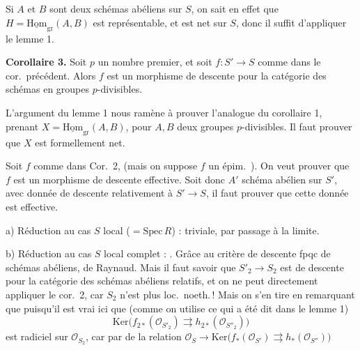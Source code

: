 \documentclass[11pt,a4paper]{article}
\begin{document}
Si $A$ et $B$ sont deux schémas abéliens sur $S$, on sait en effet que
$H = \underline{\mathrm{Hom}}_{\mathrm{gr}}(A, B)$ est représentable, et
est net sur $S$, donc il suffit d'appliquer le lemme 1.

\textbf{Corollaire 3.} Soit $p$ un nombre premier, et soit $f : S' \to S$
comme dans le cor.\ précédent. Alors $f$ est un morphisme de descente pour la
catégorie des  schémas en groupes $p$-divisibles.

L'argument  du lemme 1 nous ramène à prouver l'analogue du
corollaire 1, prenant $X = \underline{\mathrm{Hom}}_{\mathrm{gr}}(A, B)$,
pour $A, B$ deux groupes $p$-divisibles. Il faut prouver que $X$ est
formellement net.

Soit $f$ comme dans Cor.\ 2, (mais on suppose $f$ un épim.\
). On veut prouver que $f$ est un morphisme de descente
effective. Soit donc $A'$ schéma abélien sur $S'$, avec donnée de descente
relativement à $S' \to S$, il faut prouver que cette donnée est effective.

a) Réduction au cas $S$ local ($= \mathrm{Spec}\,R$) : triviale, par passage
à la limite.

\struck{\ill{} \ill{} \ill{}}

b) Réduction au cas $S$ local complet : \ill{} \ill{} \ill{}. Grâce au
critère de descente fpqc de schémas abéliens, de Raynaud. Mais il faut
savoir que $S'_2 \to S_2$ est \uncertain{morphisme} de descente pour la
catégorie des schémas abéliens relatifs, et on ne peut directement appliquer
le \struck{lemme 1, ou} cor.\ 2, car $S_2$ n'est plus loc.\ noeth.\,! Mais on
s'en tire en remarquant que puisqu'il est vrai \struck{\ill{}} ici
que (comme on utilise ce qui a été dit dans le
lemme 1) 
\[
  \mathrm{Ker}\bigl(f_{2*}(\mathcal{O}_{S'_2}) \rightrightarrows
  h_{2*}(\mathcal{O}_{S''_2})\bigr)
\]
est radiciel sur $\mathcal{O}_{S_2}$, car \ill{}  par
\ill{} \ill{} \ill{} de la relation
$\mathcal{O}_S \to \mathrm{Ker}\bigl(f_*(\mathcal{O}_{S'})
\rightrightarrows h_*(\mathcal{O}_{S''})\bigr)$ \ill{}
\end{document}
